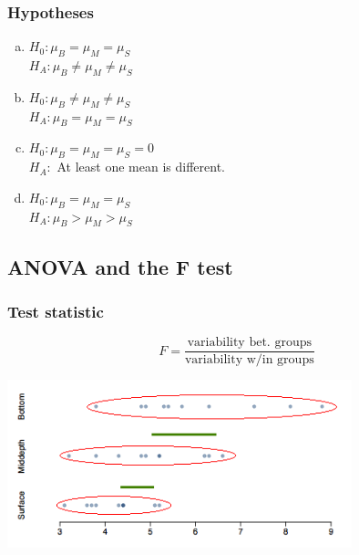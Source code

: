 \documentclass[notes,11pt, aspectratio=169]{beamer}
\begin{document}

\begin{frame}
\frametitle{Hypotheses}


\begin{enumerate}[(a)]
\item $H_0: \mu_B = \mu_M = \mu_S$ \\
$H_A: \mu_B \ne \mu_M \ne \mu_S$ \\
\item $H_0: \mu_B \ne \mu_ M \ne \mu_S$ \\
$H_A: \mu_B = \mu_M = \mu_S$ \\
\item $H_0: \mu_B = \mu_M = \mu_S = 0$ \\
$H_A:$ At least one mean is different.
\item $H_0: \mu_B = \mu_M = \mu_S$ \\
$H_A: \mu_B > \mu_M > \mu_S$ \\
\end{enumerate}

\end{frame}


\subsection{ANOVA and the F test}


\begin{frame}
\frametitle{Test statistic}


\[ F = \frac{\text{variability bet. groups}}{\text{variability w/in groups}}  \]

\begin{center}
\includegraphics[width=0.75\textwidth]{graphs/dotplot_var}
\end{center}

\end{frame}
\end{document}

